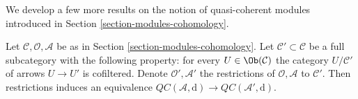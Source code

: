 \noindent
We develop a few more results on the notion of quasi-coherent
modules introduced in Section \ref{section-modules-cohomology}.

\begin{lemma}
\label{lemma-cartesian-cofinal-subcategory}
Let $\mathcal{C}, \mathcal{O}, \mathcal{A}$ be as in
Section \ref{section-modules-cohomology}. Let
$\mathcal{C}' \subset \mathcal{C}$ be a full subcategory
with the following property: for every $U \in \Ob(\mathcal{C})$ the
category $U/\mathcal{C}'$ of arrows $U \to U'$ is cofiltered.
Denote $\mathcal{O}', \mathcal{A}'$ the restrictions
of $\mathcal{O}, \mathcal{A}$ to $\mathcal{C}'$.
Then restrictions induces an equivalence
$\mathit{QC}(\mathcal{A}, \text{d}) \to \mathit{QC}(\mathcal{A}', \text{d})$.
\end{lemma}

